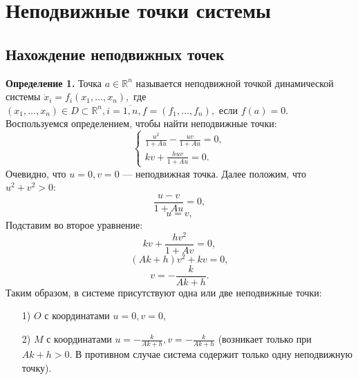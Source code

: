 \documentclass[11pt]{article}
\begin{document}
	{\section{Неподвижные точки системы}}
	{\subsection{Нахождение неподвижных точек}}
	{\textbf{Определение 1.} Точка $a \in \mathbb{R}^n$ называется неподвижной точкой динамической системы $\dot{x}_i = f_i(x_1,\ldots,x_n),$ где $(x_1,\ldots,x_n) \in D \subset \mathbb{R}^n, i = \overline{1,n}, f = (f_1, \ldots, f_n),$ если $f(a) = 0$.}
	\newline
	{Воспользуемся определением, чтобы найти неподвижные точки:}
	\begin{equation}
	\begin{cases}
				\frac{u^2}{1 + Au} - \frac{uv}{1 + Au} = 0,\\
				kv + \frac{huv}{1 + Au} = 0.
	\end{cases}
	\end{equation}
	{Очевидно, что $u = 0, v = 0$ --- неподвижная точка. Далее положим, что $u^2 + v^2 > 0:$}
	\[ \frac{u - v}{1 + Au} = 0, \]
	\[ u = v, \]
	{Подставим во второе уравнение:}
	\[  kv + \frac{hv^2}{1 + Av} = 0, \]
	\[ (Ak + h)v^2 + kv = 0, \]
	\[v = -\frac{k}{Ak + h}. \]
	{Таким образом, в системе присутствуют одна или две неподвижные точки:}
	\begin{itemize}
		\item [1)]{$O$ с координатами $u = 0, v = 0,$}
		\item [2)]{$M$ с координатами $u = -\frac{k}{Ak + h}, v = -\frac{k}{Ak + h}$ (возникает только при $Ak + h > 0$. В противном случае система содержит только одну неподвижную точку).}
	\end{itemize}
	\newpage
\end{document}
